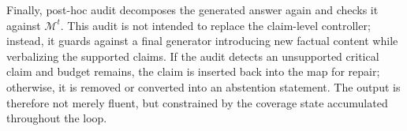 Finally, post-hoc audit decomposes the generated answer again and checks it against $\mathcal{M}^{t}$. This audit is not intended to replace the claim-level controller; instead, it guards against a final generator introducing new factual content while verbalizing the supported claims. If the audit detects an unsupported critical claim and budget remains, the claim is inserted back into the map for repair; otherwise, it is removed or converted into an abstention statement. The output is therefore not merely fluent, but constrained by the coverage state accumulated throughout the loop.
